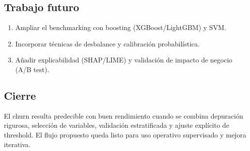 \subsection{Trabajo futuro}

\begin{enumerate}
  \item Ampliar el benchmarking con boosting (XGBoost/LightGBM) y SVM.
  \item Incorporar técnicas de desbalance y calibración probabilística.
  \item Añadir explicabilidad (SHAP/LIME) y validación de impacto de negocio (A/B test).
\end{enumerate}

\subsection{Cierre}

El churn resulta predecible con buen rendimiento cuando se combina depuración rigurosa, selección de variables, validación estratificada y ajuste explícito de threshold. El flujo propuesto queda listo para uso operativo supervisado y mejora iterativa.
